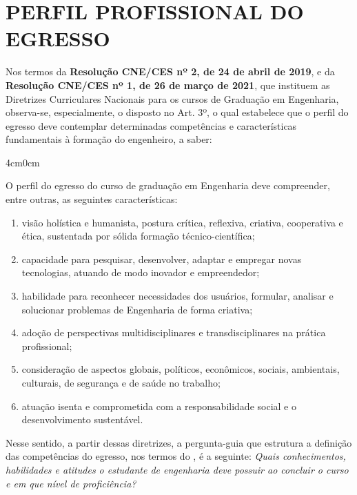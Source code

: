 \section{PERFIL PROFISSIONAL DO EGRESSO}

Nos termos da \textbf{Resolução CNE/CES nº 2, de 24 de abril de 2019}, e da \textbf{Resolução CNE/CES nº 1, de 26 de março de 2021}, que instituem as Diretrizes Curriculares Nacionais para os cursos de Graduação em Engenharia, observa-se, especialmente, o disposto no Art. 3º, o qual estabelece que o perfil do egresso deve contemplar determinadas competências e características fundamentais à formação do engenheiro, a saber:

\begin{adjustwidth}{4cm}{0cm}
\it \footnotesize {}

	O perfil do egresso do curso de graduação em Engenharia deve compreender, entre outras, as seguintes características:
	
	\begin{enumerate}[label=\Roman* -]
		\item visão holística e humanista, postura crítica, reflexiva, criativa, cooperativa e ética, sustentada por sólida formação técnico-científica;
		\item capacidade para pesquisar, desenvolver, adaptar e empregar novas tecnologias, atuando de modo inovador e empreendedor;
		\item habilidade para reconhecer necessidades dos usuários, formular, analisar e solucionar problemas de Engenharia de forma criativa;
		\item adoção de perspectivas multidisciplinares e transdisciplinares na prática profissional;
		\item consideração de aspectos globais, políticos, econômicos, sociais, ambientais, culturais, de segurança e de saúde no trabalho;
		\item atuação isenta e comprometida com a responsabilidade social e o desenvolvimento sustentável.
	\end{enumerate}
	
\end{adjustwidth}

Nesse sentido, a partir dessas diretrizes, a pergunta-guia que estrutura a definição das competências do egresso, nos termos do \cite{res259}, é a seguinte: \textit{Quais conhecimentos, habilidades e atitudes o estudante de engenharia deve possuir ao concluir o curso e em que nível de proficiência?}

